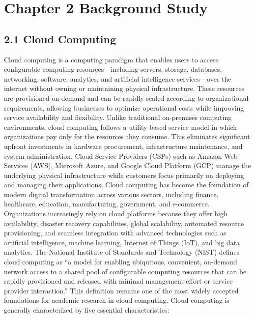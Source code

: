 \section{Chapter 2 Background Study}

\subsection{2.1 Cloud Computing}

Cloud computing is a computing paradigm that enables users to access configurable computing resources---including servers, storage, databases, networking, software, analytics, and artificial intelligence services---over the internet without owning or maintaining physical infrastructure. These resources are provisioned on demand and can be rapidly scaled according to organizational requirements, allowing businesses to optimize operational costs while improving service availability and flexibility. Unlike traditional on-premises computing environments, cloud computing follows a utility-based service model in which organizations pay only for the resources they consume. This eliminates significant upfront investments in hardware procurement, infrastructure maintenance, and system administration. Cloud Service Providers (CSPs) such as Amazon Web Services (AWS), Microsoft Azure, and Google Cloud Platform (GCP) manage the underlying physical infrastructure while customers focus primarily on deploying and managing their applications. Cloud computing has become the foundation of modern digital transformation across various sectors, including finance, healthcare, education, manufacturing, government, and e-commerce. Organizations increasingly rely on cloud platforms because they offer high availability, disaster recovery capabilities, global scalability, automated resource provisioning, and seamless integration with advanced technologies such as artificial intelligence, machine learning, Internet of Things (IoT), and big data analytics. The National Institute of Standards and Technology (NIST) defines cloud computing as ``a model for enabling ubiquitous, convenient, on-demand network access to a shared pool of configurable computing resources that can be rapidly provisioned and released with minimal management effort or service provider interaction.'' This definition remains one of the most widely accepted foundations for academic research in cloud computing. Cloud computing is generally characterized by five essential characteristics:

